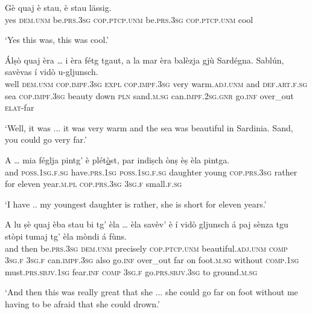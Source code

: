 \begin{linenumbers}
	\gll Gè quaj è stau, è stau lässig.\footnotemark{}   \\
	yes \textsc{dem.unm} be.\textsc{prs.3sg} \textsc{cop.ptcp.unm} be.\textsc{prs.3sg} \textsc{cop.ptcp.unm} cool\\
\end{linenumbers}
\medskip
\glt `Yes this was, this was cool.'
\medskip

\begin{linenumbers}
	\gll  Álṣò quaj èra … i èra fétg tgaut, a la mar èra balèzja gjù Sardégna. Sablún, savèvas í vidò u-gljunsch.  \\
	well \textsc{dem.unm} \textsc{cop.impf.3sg} {} \textsc{expl} \textsc{cop.impf.3sg} very warm.\textsc{adj.unm} and \textsc{def.art.f.sg} sea \textsc{cop.impf.3sg} beauty down \textsc{pln} sand.\textsc{m.sg} can.\textsc{impf.2sg.gnr} go.\textsc{inf} over\_out \textsc{elat}-far\\
\end{linenumbers}
\medskip
\glt `Well, it was ... it was very warm and the sea was beautiful in Sardinia. Sand, you could go very far.'
\medskip

\begin{linenumbers}
	\gll  A … mia féglja pintg’ è plét\underline{ò}st, par indiṣch ònṣ èṣ èla\footnotemark{} pintga.   \\
and {}	\textsc{poss.1sg.f.sg} have.\textsc{prs.1sg} {} \textsc{poss.1sg.f.sg} daughter young \textsc{cop.prs.3sg} rather for eleven year.\textsc{m.pl} \textsc{cop.prs.3sg} \textsc{3sg.f} small.\textsc{f.sg}\\
\end{linenumbers}
\medskip
\glt `I have .. my youngest daughter is rather, she is short for eleven years.'
\medskip

\begin{linenumbers}
	\gll  A lu ṣè quaj èba stau bi tg’ èla … èla savèv’ è í vidò gljunsch á paj sènza tgu stòpi tumaj tg' èla mòndi á fùns. \\
	and then be.\textsc{prs.3sg} \textsc{dem.unm} precisely \textsc{cop.ptcp.unm} beautiful.\textsc{adj.unm} \textsc{comp} \textsc{3sg.f} {} \textsc{3sg.f} can.\textsc{impf.3sg} also go.\textsc{inf} over\_out far on foot.\textsc{m.sg} without \textsc{comp.1sg} must.\textsc{prs.sbjv.1sg} fear.\textsc{inf} \textsc{comp} \textsc{3sg.f} go.\textsc{prs.sbjv.3sg} to ground.\textsc{m.sg}\\
\end{linenumbers}
\medskip
\glt `And then this was really great that she ... she could go far on foot without me having to be  afraid that she could drown.'
\medskip

